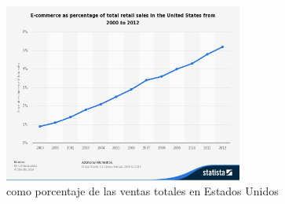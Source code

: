 
\begin{figure}[h!]
	\centering
	\includegraphics[width=0.7\textwidth]{figuras/ecommerce_percent.jpg}
	\caption{\ecommerce como porcentaje de las ventas totales en Estados Unidos \cite{online_total_sales_2000_2012}}
	\label{figure:ecommerce_percent_sales}
\end{figure}